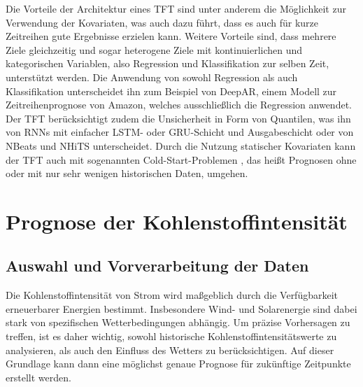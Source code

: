 Die Vorteile der Architektur eines \ac{TFT} sind unter anderem die Möglichkeit zur Verwendung der Kovariaten, was auch dazu führt, dass es auch für kurze Zeitreihen gute Ergebnisse erzielen kann.
Weitere Vorteile sind, dass mehrere Ziele gleichzeitig und sogar heterogene Ziele mit kontinuierlichen und kategorischen Variablen, also Regression und Klassifikation zur selben Zeit, unterstützt werden.
Die Anwendung von sowohl Regression als auch Klassifikation unterscheidet ihn zum Beispiel von DeepAR, einem Modell zur Zeitreihenprognose von Amazon, welches ausschließlich die Regression anwendet.
Der \ac{TFT} berücksichtigt zudem die Unsicherheit in Form von Quantilen, was ihn von \acp{RNN} mit einfacher \ac{LSTM}- oder \ac{GRU}-Schicht und Ausgabeschicht oder von NBeats und NHiTS unterscheidet.
Durch die Nutzung statischer Kovariaten kann der \ac{TFT} auch mit sogenannten \glqq Cold-Start-Problemen \grqq{}, das heißt Prognosen ohne oder mit nur sehr wenigen historischen Daten, umgehen.

\chapter{Prognose der Kohlenstoffintensität}\label{CAP:prediction}
\section{Auswahl und Vorverarbeitung der Daten}\label{CAP:data-preparation-analysis}
Die Kohlenstoffintensität von Strom wird maßgeblich durch die Verfügbarkeit erneuerbarer Energien bestimmt.
Insbesondere Wind- und Solarenergie sind dabei stark von spezifischen Wetterbedingungen abhängig.
Um präzise Vorhersagen zu treffen, ist es daher wichtig, sowohl historische Kohlenstoffintensitätswerte zu analysieren, als auch den Einfluss des Wetters zu berücksichtigen.
Auf dieser Grundlage kann dann eine möglichst genaue Prognose für zukünftige Zeitpunkte erstellt werden.

